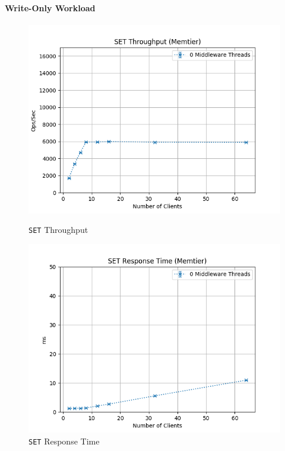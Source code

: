 \documentclass[11pt,a4paper]{article}
\begin{document}
\paragraph{Write-Only Workload}
%
\begin{figure}[H]
	\centering
    \begin{minipage}{0.5\textwidth}
        \centering
        \includegraphics[width=\textwidth]{../illustrations/plots/1_2_two_servers/1-0/memtier_set_tp_s.png}
        \caption{\texttt{SET} Throughput}
        \label{fig:two_servers_set_tp}
    \end{minipage}\hfill
    \begin{minipage}{0.5\textwidth}
        \centering
        \includegraphics[width=\textwidth]{../illustrations/plots/1_2_two_servers/1-0/memtier_set_rt_ms.png}
        \caption{\texttt{SET} Response Time}
        \label{fig:two_servers_set_rt}
    \end{minipage}
\end{figure}
\end{document}
